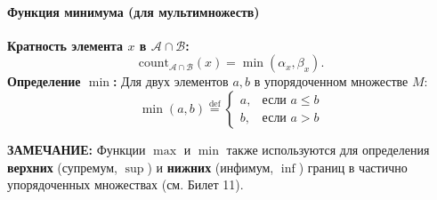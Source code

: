 \paragraph{Функция минимума (для мультимножеств)}
\textbf{Кратность элемента $x$ в $\mathcal{A} \cap \mathcal{B}$:}
$$\text{count}_{\mathcal{A} \cap \mathcal{B}}(x) = \min(\alpha_x, \beta_x).$$
\textbf{Определение $\min$:} Для двух элементов $a, b$ в упорядоченном множестве $M$:
$$\min(a, b) \stackrel{\text{def}}{=} \begin{cases}
a, & \text{если } a \le b \\
b, & \text{если } a > b
\end{cases}$$

\textbf{ЗАМЕЧАНИЕ:} Функции $\max$ и $\min$ также используются для определения \textbf{верхних} (супремум, $\sup$) и \textbf{нижних} (инфимум, $\inf$) границ в частично упорядоченных множествах (см. Билет 11).